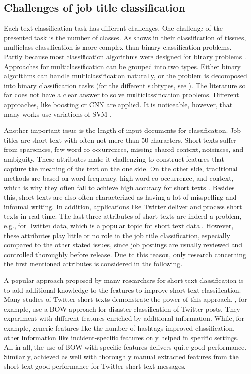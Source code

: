 \documentclass[12pt, a4paper, titlepage]{article}
\begin{document}
\subsection*{Challenges of job title classification}
Each text classification task has different challenges. One challenge of the presented task is the number of classes. As \cite{li2004} shows in their classification of tissues, multiclass classification is more complex than binary classification problems. Partly because most classification algorithms were designed for binary problems \citep{aly2005}. Approaches for multiclassification can be grouped into two types. Either binary algorithms can handle multiclassification naturally, or the problem is decomposed into binary classification tasks (for the different subtypes, see \cite{aly2005}). The literature so far does not have a clear answer to solve multiclassification problems. Different approaches, like boosting \citep{schapire2000} or \ac{CNN} \citep{farooq2017} are applied. It is noticeable, however, that many works use variations of SVM \citep{guo2015pattern, tomar2015comparison, tang2019multi2019}.  

Another important issue is the length of input documents for classification. Job titles are short text with often not more than 50 characters. Short texts suffer from sparseness, few word co-occurrences, missing shared context, noisiness, and ambiguity. These attributes make it challenging to construct features that capture the meaning of the text on the one side. On the other side, traditional methods are based on word frequency, high word co-occurrence, and context, which is why they often fail to achieve high accuracy for short texts \citep{Song2014, WangY2017, WangF2014,  alsmadi2019}. Besides this, short texts are also often characterized as having a lot of misspelling and informal writing. In addition, applications like Twitter deliver and process short texts in real-time. The last three attributes of short texts are indeed a problem, e.g., for Twitter data, which is a popular topic for short text data \citep{karimi2013, sriram2010, yan2018}. However, these attributes play little or no role in the job title classification, especially compared to the other stated issues, since job postings are usually reviewed and controlled thoroughly before release. Due to this reason, only research concerning the first mentioned attributes is considered in the following. 

A popular approach proposed by many researchers for short text classification is to add additional knowledge to the features to improve short text classification. Many studies of Twitter short texts demonstrate the power of this approach. \citet{karimi2013}, for example, use a \ac{BOW} approach for disaster classification of Twitter posts. They experiment with different features enriched by additional information. While, for example, generic features like the number of hashtags improved classification, other information like incident-specific features only helped in specific settings. All in all, the use of \ac{BOW} with specific features delivers quite good performance. Similarly, \citet{sriram2010} achieved as well with thoroughly manual extracted features from the short text good performance for Twitter short text messages. 
\end{document}
